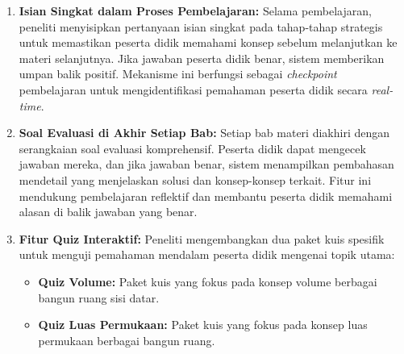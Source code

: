 \begin{enumerate}[leftmargin=1cm, label=\arabic*.]
\begin{enumerate}[label=\arabic*)]
        \begin{enumerate}[leftmargin=*, label=--]
            \item \textbf{Isian Singkat dalam Proses Pembelajaran:} Selama pembelajaran, peneliti menyisipkan pertanyaan isian singkat pada tahap-tahap strategis untuk memastikan peserta didik memahami konsep sebelum melanjutkan ke materi selanjutnya. Jika jawaban peserta didik benar, sistem memberikan umpan balik positif. Mekanisme ini berfungsi sebagai \textit{checkpoint} pembelajaran untuk mengidentifikasi pemahaman peserta didik secara \textit{real-time}.
            
            \item \textbf{Soal Evaluasi di Akhir Setiap Bab:} Setiap bab materi diakhiri dengan serangkaian soal evaluasi komprehensif. Peserta didik dapat mengecek jawaban mereka, dan jika jawaban benar, sistem menampilkan pembahasan mendetail yang menjelaskan solusi dan konsep-konsep terkait. Fitur ini mendukung pembelajaran reflektif dan membantu peserta didik memahami alasan di balik jawaban yang benar.
            
            \item \textbf{Fitur Quiz Interaktif:} Peneliti mengembangkan dua paket kuis spesifik untuk menguji pemahaman mendalam peserta didik mengenai topik utama:
            \begin{itemize}
                \item \textbf{Quiz Volume:} Paket kuis yang fokus pada konsep volume berbagai bangun ruang sisi datar.
                \item \textbf{Quiz Luas Permukaan:} Paket kuis yang fokus pada konsep luas permukaan berbagai bangun ruang.
            \end{itemize}
            

\end{enumerate}
\end{enumerate}
\end{enumerate}
